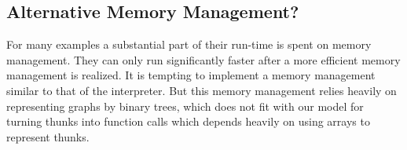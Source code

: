 \subsection{Alternative Memory Management?}
For many \Sapljs examples a substantial part of their run-time is spent on memory management. 
They can only run significantly faster after a more efficient memory management is realized.
It is tempting to implement a memory management similar to that of the \Sapl interpreter. 
But this memory management relies heavily on representing graphs by binary trees, 
which does not fit with our model for turning thunks into \JS function calls which depends heavily on using arrays to
represent thunks.




